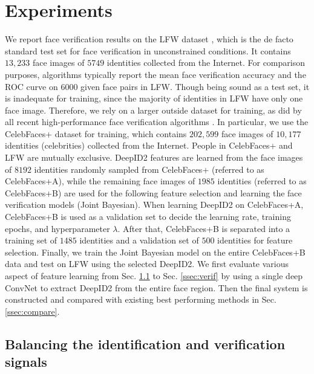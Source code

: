 \documentclass{article} %
\begin{document}
\section{Experiments}

We report face verification results on the LFW dataset \cite{huang2007}, which is the de facto standard test set for face verification in unconstrained conditions. It contains $13,233$ face images of $5749$ identities collected from the Internet. For comparison purposes, algorithms typically report the mean face verification accuracy and the ROC curve on $6000$ given face pairs in LFW. Though being sound as a test set, it is inadequate for training, since the majority of identities in LFW have only one face image. Therefore, we rely on a larger outside dataset for training, as did by all recent high-performance face verification algorithms \cite{chen2013,cao2013,taigman2014,sun2014,lu2014}. In particular, we use the CelebFaces+ dataset \cite{sun2014} for training, which contains $202,599$ face images of $10,177$ identities (celebrities) collected from the Internet. People in CelebFaces+ and LFW are mutually exclusive. DeepID2 features are learned from the face images of $8192$ identities randomly sampled from CelebFaces+ (referred to as CelebFaces+A), while the remaining face images of $1985$ identities (referred to as CelebFaces+B) are used for the following feature selection and learning the face verification models (Joint Bayesian). When learning DeepID2 on CelebFaces+A, CelebFaces+B is used as a validation set to decide the learning rate, training epochs, and hyperparameter $\lambda$. After that, CelebFaces+B is separated into a training set of $1485$ identities and a validation set of $500$ identities for feature selection. Finally, we train the Joint Bayesian model on the entire CelebFaces+B data and test on LFW using the selected DeepID2. We first evaluate various aspect of feature learning from Sec. \ref{ssec:idve} to Sec. \ref{ssec:verif} by using a single deep ConvNet to extract DeepID2 from the entire face region. Then the final system is constructed and compared with existing best performing methods in Sec. \ref{ssec:compare}.


\subsection{Balancing the identification and verification signals}
\label{ssec:idve}
\end{document}
